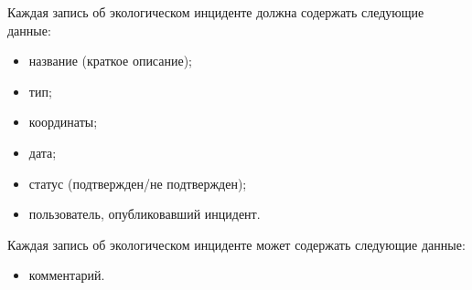 Каждая запись об экологическом инциденте должна содержать следующие данные:
\begin{itemize}
	\item название (краткое описание);
	\item тип;
	\item координаты;
	\item дата;
	\item статус (подтвержден/не подтвержден);
	\item пользователь, опубликовавший инцидент.
\end{itemize}

Каждая запись об экологическом инциденте может содержать следующие данные:
\begin{itemize}
	\item комментарий.
\end{itemize}

